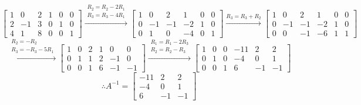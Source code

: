 \documentclass{article}
\begin{document}
\[
	\begin{bmatrix}
		1 & 0  & 2 & 1 & 0 & 0 \\
		2 & -1 & 3 & 0 & 1 & 0 \\
		4 & 1  & 8 & 0 & 0 & 1
	\end{bmatrix}
	\xrightarrow{
		\begin{aligned}
			R_2 = R_2 - 2R_1 \\
			R_3 = R_3 - 4R_1
		\end{aligned}
	}
	\begin{bmatrix}
		1 & 0  & 2  & 1  & 0 & 0 \\
		0 & -1 & -1 & -2 & 1 & 0 \\
		0 & 1  & 0  & -4 & 0 & 1
	\end{bmatrix}
	\xrightarrow{R_3=R_3+R_2}
	\begin{bmatrix}
		1 & 0  & 2  & 1  & 0 & 0 \\
		0 & -1 & -1 & -2 & 1 & 0 \\
		0 & 0  & -1 & -6 & 1 & 1
	\end{bmatrix}
\]
\[
	\xrightarrow{
		\begin{aligned}
			R_2 = -R_2 \\
			R_3 = -R_3 - 5R_1
		\end{aligned}
	}
	\begin{bmatrix}
		1 & 0 & 2 & 1 & 0  & 0  \\
		0 & 1 & 1 & 2 & -1 & 0  \\
		0 & 0 & 1 & 6 & -1 & -1
	\end{bmatrix}
	\xrightarrow{
		\begin{aligned}
			R_1 = R_1 - 2R_3 \\
			R_2 = R_2 - R_3
		\end{aligned}
	}
	\begin{bmatrix}
		1 & 0 & 0 & -11 & 2  & 2  \\
		0 & 1 & 0 & -4  & 0  & 1  \\
		0 & 0 & 1 & 6   & -1 & -1
	\end{bmatrix}
\]
\[
	\therefore A^{-1} =
	\begin{bmatrix}
		-11 & 2  & 2  \\
		-4  & 0  & 1  \\
		6   & -1 & -1
	\end{bmatrix}
\]
\end{document}
